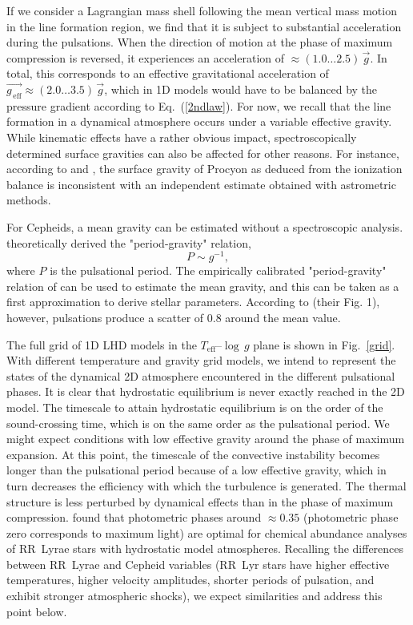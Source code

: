 \documentclass{aa}
\begin{document}
If we consider a Lagrangian mass shell following the mean vertical mass motion
in the line formation region, we find that it is subject to substantial
acceleration during the pulsations.  When the
direction of motion at the phase of maximum compression is reversed, it experiences an
acceleration of $\approx (1.0 \ldots 2.5)\,\vec{g}$.  In total, this
corresponds to an effective gravitational acceleration of
$\vec{g_\mathrm{\,eff}} \approx (2.0 \ldots 3.5)\,\vec{g}$, which in 1D models
would have to be balanced by the pressure gradient according to
Eq.~(\ref{2ndlaw}). For now, we recall that the line formation 
in a dynamical atmosphere occurs under a variable effective gravity.  While
kinematic effects have a rather obvious impact, spectroscopically determined
surface gravities can also be affected for other reasons. For instance,
according to \cite{1985A&AS...59..403S} and \cite{2003A&A...407..691K}, the
surface gravity of Procyon as deduced from the ionization balance is
inconsistent with an independent estimate obtained with astrometric methods.

For Cepheids, a mean gravity can be estimated without a spectroscopic analysis.
\cite{1965ApJ...142.1649G} theoretically  derived the "period-gravity" relation, 
%
\begin{equation}
P \sim g^{-1},
\end{equation}
%
where $P$ is the pulsational period.  The empirically 
calibrated  "period-gravity" relation of \cite{1988Ap&SS.150..357T}
 can be used to estimate the 
mean gravity,  and  this can be taken as a first
approximation to derive stellar parameters. According
to \cite{2002A&A...381...32A} (their Fig. 1), however, pulsations produce a scatter of 0.8 
around the mean value.


The full grid of 1D LHD models in the $T_\mathrm{eff}$--$\log\,g$ plane is
shown in Fig.~\ref{grid}. With different temperature and
gravity grid models, we intend to represent the states of the dynamical 2D atmosphere
encountered in the different pulsational phases.  It is clear that  
hydrostatic equilibrium is never exactly reached in the 2D model. The
timescale to attain  hydrostatic equilibrium is on the order of the
sound-crossing time, which is on the same order as the pulsational period.  We
might expect conditions with low effective gravity around the phase of 
maximum expansion.
At this point, the timescale of the convective instability
becomes longer than the pulsational period because of a low effective gravity,
which in turn decreases the efficiency with which the turbulence
is generated. 
The thermal structure is less perturbed by dynamical effects than in the 
phase of maximum compression.
\cite{2011ApJS..197...29F} found that photometric phases around $\approx 0.35$
(photometric phase zero corresponds to maximum light) are optimal for chemical
abundance analyses of RR~Lyrae stars with hydrostatic model
atmospheres. Recalling the differences between RR~Lyrae and Cepheid
variables (RR~Lyr stars have higher effective temperatures, higher velocity
amplitudes, shorter periods of pulsation, and exhibit stronger atmospheric
shocks), we expect similarities and address this point below.
\end{document}
